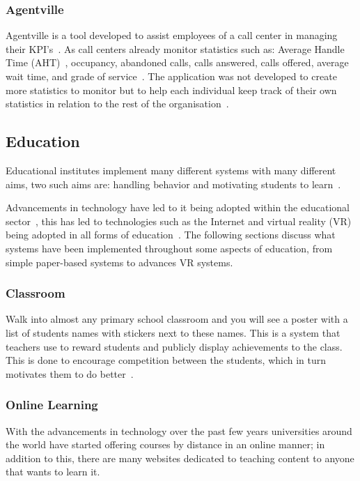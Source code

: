 \documentclass[a4paper,12pt]{article}
\begin{document}
\subsubsection{Agentville}\label{sec:agentville}
Agentville is a tool developed to assist employees of a call center in managing their KPI's~\citep{production-environments}. 
As call centers already monitor statistics such as: Average Handle Time (AHT)~\citep{production-environments},	occupancy, abandoned calls,	calls answered,	calls offered, average wait time, and grade of service~\citep{call-center}. 
The application was not developed to create more statistics to monitor but to help each individual keep track of their own statistics in relation to the rest of the organisation~\citep{production-environments}.

\subsection{Education}\label{sec:education}
Educational institutes implement many different systems with many different aims, two such aims are: handling behavior and motivating students to learn~\citep{deci_extrinsic_2001}.

\par
Advancements in technology have led to it being adopted within the educational sector~\citep{distance-education}, this has led to technologies such as the Internet and virtual reality (VR) being adopted in all forms of education~\citep{virtual-reality}.
The following sections discuss what systems have been implemented throughout some aspects of education, from simple paper-based systems to advances VR systems.

\subsubsection{Classroom}\label{sec:classroom}
Walk into almost any primary school classroom and you will see a poster with a list of students names with stickers next to these names. 
This is a system that teachers use to reward students and publicly display achievements to the class. 
This is done to encourage competition between the students, which in turn motivates them to do better~\citep{school-kids}.

\subsubsection{Online Learning}
With the advancements in technology over the past few years universities around the world have started offering courses by distance in an online manner; in addition to this, there are many websites dedicated to teaching content to anyone that wants to learn it.
\end{document}
